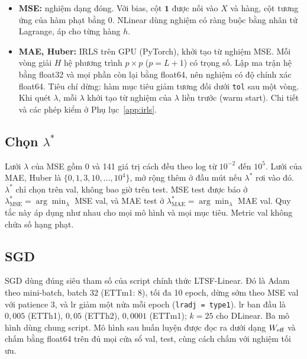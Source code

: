 \begin{itemize}
    \item \textbf{MSE:} nghiệm dạng đóng. Với bias, cột $\mathbf 1$ được nối vào $X$ và hàng, cột tương ứng của hàm phạt bằng $0$. NLinear dùng nghiệm có ràng buộc bằng nhân tử Lagrange, áp cho từng hàng $h$.
    \item \textbf{MAE, Huber:} IRLS trên GPU (PyTorch), khởi tạo từ nghiệm MSE. Mỗi vòng giải $H$ hệ phương trình $p \times p$ ($p = L + 1$) có trọng số. Lập ma trận hệ bằng float32 và mọi phần còn lại bằng float64, nên nghiệm có độ chính xác float64. Tiêu chí dừng: hàm mục tiêu giảm tương đối dưới \texttt{tol} sau một vòng. Khi quét $\lambda$, mỗi $\lambda$ khởi tạo từ nghiệm của $\lambda$ liền trước (warm start). Chi tiết và các phép kiểm ở Phụ lục~\ref{app:irls}.
\end{itemize}

\subsection{Chọn \texorpdfstring{$\lambda^*$}{lambda*}}
\label{sec:method-lambda}

Lưới $\lambda$ của MSE gồm $0$ và 141 giá trị cách đều theo log từ $10^{-2}$ đến $10^{5}$. Lưới của MAE, Huber là $\{0, 1, 3, 10, \dots, 10^4\}$, mở rộng thêm ở đầu mút nếu $\lambda^*$ rơi vào đó. $\lambda^*$ chỉ chọn trên val, không bao giờ trên test. MSE test được báo ở $\lambda^*_{\mathrm{MSE}} = \arg\min_\lambda$ MSE val, và MAE test ở $\lambda^*_{\mathrm{MAE}} = \arg\min_\lambda$ MAE val. Quy tắc này áp dụng như nhau cho mọi mô hình và mọi mục tiêu. Metric val không chứa số hạng phạt.

\subsection{SGD}
\label{sec:method-sgd}

SGD dùng đúng siêu tham số của script chính thức LTSF-Linear. Đó là Adam theo mini-batch, batch 32 (ETTm1: 8), tối đa 10 epoch, dừng sớm theo MSE val với patience 3, và lr giảm một nửa mỗi epoch (\texttt{lradj = type1}). lr ban đầu là $0{,}005$ (ETTh1), $0{,}05$ (ETTh2), $0{,}0001$ (ETTm1); $k = 25$ cho DLinear. Ba mô hình dùng chung script. Mô hình sau huấn luyện được đọc ra dưới dạng $W_{\mathrm{eff}}$ và chấm bằng float64 trên đủ mọi cửa sổ val, test, cùng cách chấm với nghiệm tối ưu.

